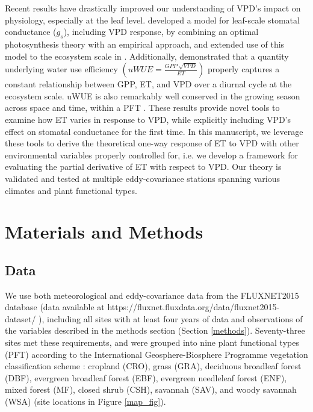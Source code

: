 \documentclass[draft,linenumbers]{agujournal}
\begin{document}
Recent results have drastically improved our understanding of VPD's
impact on physiology, especially at the leaf
level. \citet{MEDLYN_2011} developed a model for leaf-scale stomatal
conductance ($g_s$), including VPD response, by combining an optimal
photosynthesis theory \citep{Farquhar_1980, Katul_2010} with an
empirical approach, and extended use of this model to the ecosystem
scale in \citet{Medlyn_2017}. Additionally, \citet{Zhou_2014}
demonstrated that a quantity underlying water use efficiency
$\left(uWUE = \frac{GPP\; \sqrt{VPD}}{ET}\right)$ properly captures a
constant relationship between GPP, ET, and VPD over a diurnal cycle at
the ecosystem scale. uWUE is also remarkably well conserved in the
growing season across space and time, within a PFT
\citep{Zhou_2015}. These results provide novel tools to examine how ET
varies in response to VPD, while explicitly including VPD's effect on
stomatal conductance for the first time. In this manuscript, we
leverage these tools to derive the theoretical one-way response of ET
to VPD with other environmental variables properly controlled for,
i.e. we develop a framework for evaluating the partial derivative of
ET with respect to VPD. Our theory is validated and tested at multiple
eddy-covariance stations spanning various climates and plant
functional types.

\section{Materials and Methods}
\subsection{Data}
\label{data}
We use both meteorological and eddy-covariance data from the
FLUXNET2015 database (data available at \sloppy
https://fluxnet.fluxdata.org/data/fluxnet2015-dataset/ \sloppy),
including all sites with at least four years of data and observations
of the variables described in the methods section (Section
\ref{methods}). Seventy-three sites met these requirements, and were
grouped into nine plant functional types (PFT) according to the
International Geosphere-Biosphere Programme vegetation classification
scheme \citep{Loveland_1999}: cropland (CRO), grass (GRA), deciduous
broadleaf forest (DBF), evergreen broadleaf forest (EBF), evergreen
needleleaf forest (ENF), mixed forest (MF), closed shrub (CSH),
savannah (SAV), and woody savannah (WSA) (site locations in Figure
\ref{map_fig}).
\end{document}
